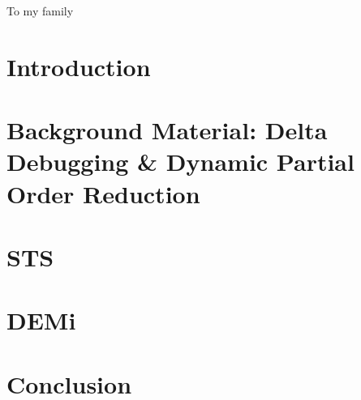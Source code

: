 

\begin{abstract}

\end{abstract}

\begin{frontmatter}

\begin{dedication}
\null\vfil
{\large
\begin{center}
To my family
\end{center}}
\null\vfil
\end{dedication}

\tableofcontents
\listoffigures %
\listoftables %



\end{frontmatter}

\chapter{Introduction}
\label{sec:intro}


\chapter{Background Material: Delta Debugging \& Dynamic Partial Order
Reduction}
\label{sec:background_material}


\chapter{STS}
\label{sec:sts}


\chapter{DEMi}
\label{sec:demi}


\chapter{Conclusion}
\label{main_sec:conclusion}


%

%


\printbibliography


